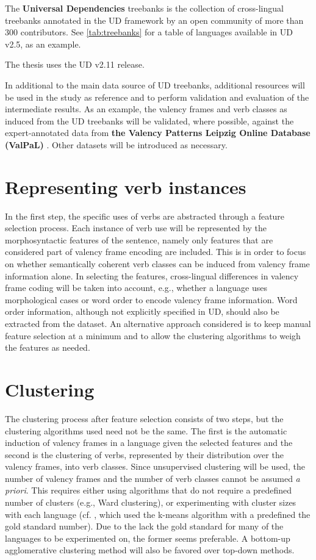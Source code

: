 The \textbf{Universal Dependencies} treebanks \citep{universaldep} is the collection of cross-lingual treebanks annotated in the UD framework by an open community of more than 300 contributors. See \ref{tab:treebanks} for a table of languages available in UD v2.5, as an example.



The thesis uses the UD v2.11 release.

In additional to the main data source of UD treebanks, additional resources will be used in the study as reference and to perform validation and evaluation of the intermediate results. As an example, the valency frames and verb classes as induced from the UD treebanks will be validated, where possible, against the expert-annotated data from \textbf{the Valency Patterns Leipzig Online Database (ValPaL)} \citep{valpal}. Other datasets will be introduced as necessary.

\section{Representing verb instances}

In the first step, the specific uses of verbs are abstracted through a feature selection process. Each instance of verb use will be represented by the morphosyntactic features of the sentence, namely only features that are considered part of valency frame encoding are included. This is in order to focus on whether semantically coherent verb classes can be induced from valency frame information alone. In selecting the features, cross-lingual differences in valency frame coding will be taken into account, e.g., whether a language uses morphological cases or word order to encode valency frame information. Word order information, although not explicitly specified in UD, should also be extracted from the dataset. An alternative approach considered is to keep manual feature selection at a minimum and to allow the clustering algorithms to weigh the features as needed.

\section{Clustering}

The clustering process after feature selection consists of two steps, but the clustering algorithms used need not be the same. The first is the automatic induction of valency frames in a language given the selected features and the second is the clustering of verbs, represented by their distribution over the valency frames, into verb classes. Since unsupervised clustering will be used, the number of valency frames and the number of verb classes cannot be assumed \textit{a priori}. This requires either using algorithms that do not require a predefined number of clusters (e.g., Ward clustering), or experimenting with cluster sizes with each language (cf. \cite{schulteimwalde2006}, which used the k-means algorithm with a predefined the gold standard number). Due to the lack the gold standard for many of the languages to be experimented on, the former seems preferable. A bottom-up agglomerative clustering method will also be favored over top-down methods.

